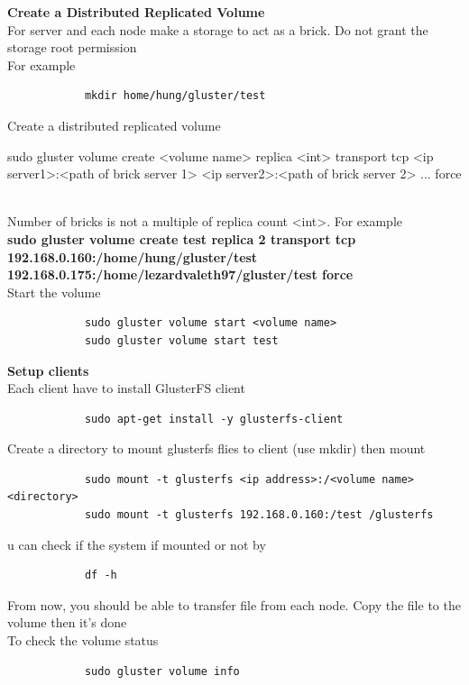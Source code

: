\documentclass[12pt]{article}
\begin{document}
    \textbf{\large Create a Distributed Replicated Volume}\\
        For server and each node make a storage to act as a brick. Do not grant the storage root permission\\
        For example
        \begin{verbatim}
            mkdir home/hung/gluster/test
        \end{verbatim}
        Create a distributed replicated volume
        \begin{spverbatim}
           sudo gluster volume create <volume name> replica <int> transport tcp <ip server1>:<path of brick server 1> <ip server2>:<path of brick server 2> ... force
        \end{spverbatim}
        \\Number of bricks is not a multiple of replica count <int>. For example\\
         \textbf{\small sudo gluster volume create test replica 2 transport tcp 
         192.168.0.160:/home/hung/gluster/test 192.168.0.175:/home/lezardvaleth97/gluster/test force}
        \\Start the volume
        \begin{verbatim}
            sudo gluster volume start <volume name>
            sudo gluster volume start test
        \end{verbatim}
        \textbf{Setup clients}\\
        Each client have to install GlusterFS client
        \begin{verbatim}
            sudo apt-get install -y glusterfs-client
        \end{verbatim}
        Create a directory to mount glusterfs flies to client (use mkdir) then mount
        \begin{verbatim}
            sudo mount -t glusterfs <ip address>:/<volume name> <directory>
            sudo mount -t glusterfs 192.168.0.160:/test /glusterfs
        \end{verbatim}
        u can check if the system if mounted or not by
        \begin{verbatim}
            df -h
        \end{verbatim}
        From now, you should be able to transfer file from each node. Copy the file to the volume then it's done\\
        To check the volume status
        \begin{verbatim}
            sudo gluster volume info
        \end{verbatim}
 
\end{document}
